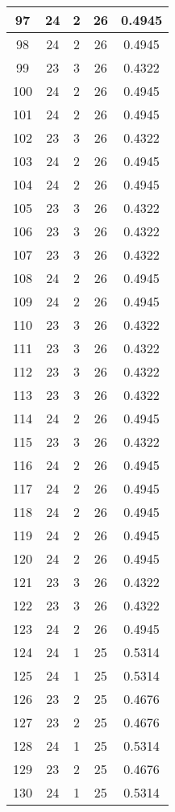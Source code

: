 \documentclass[letterpaper, 12pt]{article}
\begin{document}
\begin{longtable}{|c|c|c|c|c|}
\hline
97 & 24 & 2 & 26 & 0.4945 \\
\hline
98 & 24 & 2 & 26 & 0.4945 \\
\hline
99 & 23 & 3 & 26 & 0.4322 \\
\hline
100 & 24 & 2 & 26 & 0.4945 \\
\hline
101 & 24 & 2 & 26 & 0.4945 \\
\hline
102 & 23 & 3 & 26 & 0.4322 \\
\hline
103 & 24 & 2 & 26 & 0.4945 \\
\hline
104 & 24 & 2 & 26 & 0.4945 \\
\hline
105 & 23 & 3 & 26 & 0.4322 \\
\hline
106 & 23 & 3 & 26 & 0.4322 \\
\hline
107 & 23 & 3 & 26 & 0.4322 \\
\hline
108 & 24 & 2 & 26 & 0.4945 \\
\hline
109 & 24 & 2 & 26 & 0.4945 \\
\hline
110 & 23 & 3 & 26 & 0.4322 \\
\hline
111 & 23 & 3 & 26 & 0.4322 \\
\hline
112 & 23 & 3 & 26 & 0.4322 \\
\hline
113 & 23 & 3 & 26 & 0.4322 \\
\hline
114 & 24 & 2 & 26 & 0.4945 \\
\hline
115 & 23 & 3 & 26 & 0.4322 \\
\hline
116 & 24 & 2 & 26 & 0.4945 \\
\hline
117 & 24 & 2 & 26 & 0.4945 \\
\hline
118 & 24 & 2 & 26 & 0.4945 \\
\hline
119 & 24 & 2 & 26 & 0.4945 \\
\hline
120 & 24 & 2 & 26 & 0.4945 \\
\hline
121 & 23 & 3 & 26 & 0.4322 \\
\hline
122 & 23 & 3 & 26 & 0.4322 \\
\hline
123 & 24 & 2 & 26 & 0.4945 \\
\hline
124 & 24 & 1 & 25 & 0.5314 \\
\hline
125 & 24 & 1 & 25 & 0.5314 \\
\hline
126 & 23 & 2 & 25 & 0.4676 \\
\hline
127 & 23 & 2 & 25 & 0.4676 \\
\hline
128 & 24 & 1 & 25 & 0.5314 \\
\hline
129 & 23 & 2 & 25 & 0.4676 \\
\hline
130 & 24 & 1 & 25 & 0.5314 \\

\end{longtable}
\end{document}
